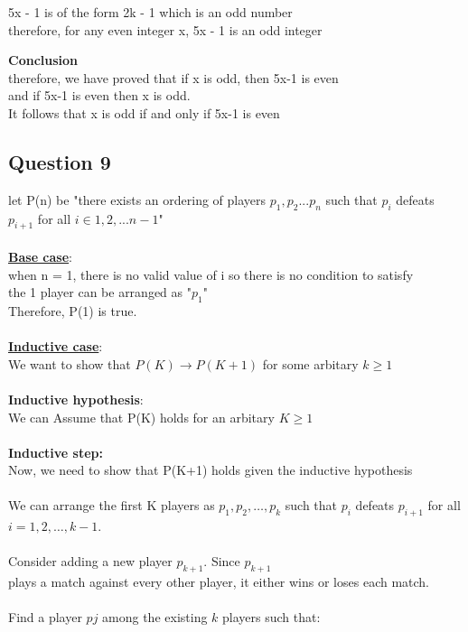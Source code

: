 \documentclass[11pt]{article}
\begin{document}
{{{\noindent
5x - 1 is of the form 2k - 1 which is an odd number \\
therefore, for any even integer x, 5x - 1 is an odd integer

\noindent
\textbf{Conclusion} \\
therefore, we have proved that if x is odd, then 5x-1 is even \\
and if 5x-1 is even then x is odd. \\
It follows that x is odd if and only if 5x-1 is even

\subsection*{Question 9}
let P(n) be "there exists an ordering of players $p_1, p_2...p_n$
such that $p_i$ defeats $p_{i+1}$ for all $i \in 1, 2, ... n-1$"\\\\
%
\underline{\textbf{Base case}}: \\
when n = 1, there is no valid value of i so there is no condition to satisfy \\
the 1 player can be arranged as "$p_1$" \\
Therefore, P(1) is true.
\\ \\
\underline{\textbf{Inductive case}}: \\
We want to show that $P(K) \rightarrow P(K+1)$ for some arbitary $k \geq 1$ \\
\\
\textbf{Inductive hypothesis}: \\
We can Assume that P(K) holds for an arbitary $K \geq 1$ \\
\\
\textbf{Inductive step:} \\
Now, we need to show that P(K+1) holds given the inductive hypothesis \\
\\
We can arrange the first K players as $p_1, p_2, \ldots, p_k$
such that $p_i$ defeats $p_{i+1}$ for all
$i = 1, 2, \ldots, k-1$.\\
\\
Consider adding a new player $p_{k+1}$. Since $p_{k+1}$\\
plays a match against every other player, it either wins or loses each match.\\
\\
Find a player $pj$ among the existing $k$ players such that:\\
}}}
\end{document}
